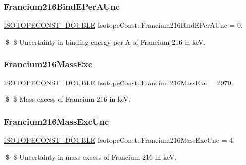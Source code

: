 \subsubsection{\texorpdfstring{Francium216\+Bind\+E\+Per\+A\+Unc}{Francium216BindEPerAUnc}}
{\footnotesize\ttfamily \mbox{\hyperlink{group___isotope_const-_macros_ga8f45a7272ce02c0b4c65c44636ed719a}{I\+S\+O\+T\+O\+P\+E\+C\+O\+N\+S\+T\+\_\+\+D\+O\+U\+B\+LE}} Isotope\+Const\+::\+Francium216\+Bind\+E\+Per\+A\+Unc = 0.}

\$ \$ Uncertainty in binding energy per A of Francium-\/216 in keV. \mbox{\label{group___isotope_const-_francium-_fr216_gaae5d0785a8e3119737b35f9f67ac3b36}} 
\subsubsection{\texorpdfstring{Francium216\+Mass\+Exc}{Francium216MassExc}}
{\footnotesize\ttfamily \mbox{\hyperlink{group___isotope_const-_macros_ga8f45a7272ce02c0b4c65c44636ed719a}{I\+S\+O\+T\+O\+P\+E\+C\+O\+N\+S\+T\+\_\+\+D\+O\+U\+B\+LE}} Isotope\+Const\+::\+Francium216\+Mass\+Exc = 2970.}

\$ \$ Mass excess of Francium-\/216 in keV. \mbox{\label{group___isotope_const-_francium-_fr216_ga4b1769ed6c9dc5602bf05dd0d1b28297}} 
\subsubsection{\texorpdfstring{Francium216\+Mass\+Exc\+Unc}{Francium216MassExcUnc}}
{\footnotesize\ttfamily \mbox{\hyperlink{group___isotope_const-_macros_ga8f45a7272ce02c0b4c65c44636ed719a}{I\+S\+O\+T\+O\+P\+E\+C\+O\+N\+S\+T\+\_\+\+D\+O\+U\+B\+LE}} Isotope\+Const\+::\+Francium216\+Mass\+Exc\+Unc = 4.}

\$ \$ Uncertainty in mass excess of Francium-\/216 in keV. \mbox{\label{group___isotope_const-_francium-_fr216_ga99c3c14649611d55bc75bfd815a268d4}} 
